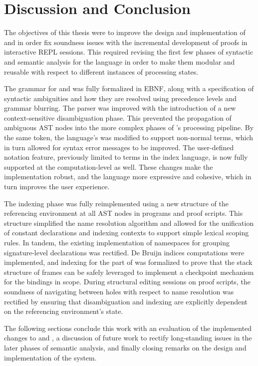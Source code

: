 \chapter{Discussion and Conclusion}\label{chapter:conclusion}

The objectives of this thesis were to improve the design and implementation of \Beluga and \Harpoon in order fix soundness issues with the incremental development of proofs in interactive \ac{REPL} sessions.
This required revising the first few phases of syntactic and semantic analysis for the language in order to make them modular and reusable with respect to different instances of processing states.

The grammar for \Beluga and \Harpoon was fully formalized in \ac{EBNF}, along with a specification of syntactic ambiguities and how they are resolved using precedence levels and grammar blurring.
The parser was improved with the introduction of a new context-sensitive disambiguation phase.
This prevented the propagation of ambiguous \ac{AST} nodes into the more complex phases of \Beluga's processing pipeline.
By the same token, the language's was modified to support non-normal terms, which in turn allowed for syntax error messages to be improved.
The user-defined notation feature, previously limited to terms in the index language, is now fully supported at the computation-level as well.
These changes make the implementation robust, and the language more expressive and cohesive, which in turn improves the user experience.

The indexing phase was fully reimplemented using a new structure of the referencing environment at all \ac{AST} nodes in \Beluga programs and \Harpoon proof scripts.
This structure simplified the name resolution algorithm and allowed for the unification of constant declarations and indexing contexts to support simple lexical scoping rules.
In tandem, the existing implementation of namespaces for grouping signature-level declarations was rectified.
De Bruijn indices computations were implemented, and indexing for the \LF part of \Beluga was formalized to prove that the stack structure of frames can be safely leveraged to implement a checkpoint mechanism for the bindings in scope.
During \Harpoon structural editing sessions on proof scripts, the soundness of navigating between holes with respect to name resolution was rectified by ensuring that disambiguation and indexing are explicitly dependent on the referencing environment's state.

The following sections conclude this work with an evaluation of the implemented changes to \Beluga and \Harpoon, a discussion of future work to rectify long-standing issues in the later phases of semantic analysis, and finally closing remarks on the design and implementation of the system.

